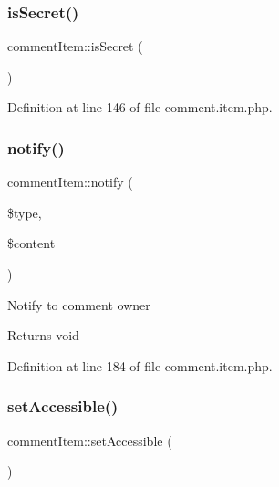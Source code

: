 \mbox{\label{classcommentItem_abae79d7831d1674aec166e449a70dca7}} 
\subsubsection{\texorpdfstring{is\+Secret()}{isSecret()}}
{\footnotesize\ttfamily comment\+Item\+::is\+Secret (\begin{DoxyParamCaption}{ }\end{DoxyParamCaption})}



Definition at line 146 of file comment.\+item.\+php.

\mbox{\label{classcommentItem_a7fb0c8b5afc30c493450664c8b885db5}} 
\subsubsection{\texorpdfstring{notify()}{notify()}}
{\footnotesize\ttfamily comment\+Item\+::notify (\begin{DoxyParamCaption}\item[{}]{\$type,  }\item[{}]{\$content }\end{DoxyParamCaption})}

Notify to comment owner \begin{DoxyReturn}{Returns}
void 
\end{DoxyReturn}


Definition at line 184 of file comment.\+item.\+php.

\mbox{\label{classcommentItem_af9af617b212fccb1f308ff0b0feff48f}} 
\subsubsection{\texorpdfstring{set\+Accessible()}{setAccessible()}}
{\footnotesize\ttfamily comment\+Item\+::set\+Accessible (\begin{DoxyParamCaption}{ }\end{DoxyParamCaption})}



